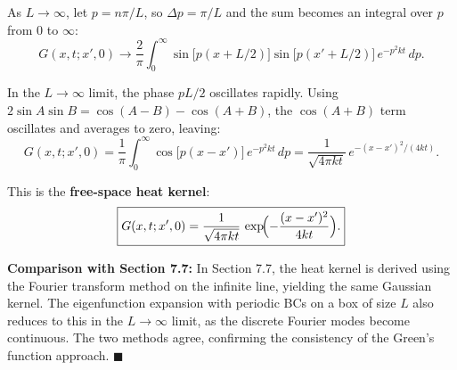 \documentclass[12pt]{article}
\begin{document}
As $L \to \infty$, let $p = n\pi/L$, so $\Delta p = \pi/L$ and the sum becomes an integral over $p$ from $0$ to $\infty$:
\[
G(x,t;x',0) \to \frac{2}{\pi}\int_0^{\infty}\sin\bigl[p(x+L/2)\bigr]\sin\bigl[p(x'+L/2)\bigr]\,e^{-p^2 kt}\,dp.
\]

In the $L\to\infty$ limit, the phase $pL/2$ oscillates rapidly. Using $2\sin A\sin B = \cos(A-B) - \cos(A+B)$, the $\cos(A+B)$ term oscillates and averages to zero, leaving:
\[
G(x,t;x',0) = \frac{1}{\pi}\int_0^{\infty}\cos\bigl[p(x-x')\bigr]\,e^{-p^2 kt}\,dp = \frac{1}{\sqrt{4\pi kt}}\,e^{-(x-x')^2/(4kt)}.
\]

This is the \textbf{free-space heat kernel}:
\[
\boxed{G(x,t;x',0) = \frac{1}{\sqrt{4\pi kt}}\,\exp\!\Bigl(-\frac{(x-x')^2}{4kt}\Bigr).}
\]

\textbf{Comparison with Section 7.7:} In Section 7.7, the heat kernel is derived using the Fourier transform method on the infinite line, yielding the same Gaussian kernel. The eigenfunction expansion with periodic BCs on a box of size $L$ also reduces to this in the $L \to \infty$ limit, as the discrete Fourier modes become continuous. The two methods agree, confirming the consistency of the Green's function approach. $\blacksquare$
\end{document}
